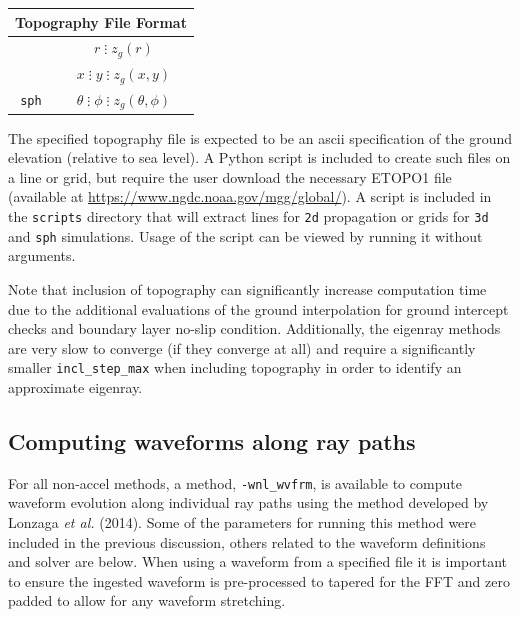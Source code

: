\documentclass[10pt]{article}
\begin{document}
\begin{center}
\begin{tabular}{| c | c |}
  \hline
  \multicolumn{2}{|c|}{\textbf{Topography File Format}} \\
  \hline
  \verb#2d#	 	& \(r \; \vdots \; z_g \left( r \right) \) \\ \hline
  \verb#3d#	 	& \(x \; \vdots \; y \; \vdots \; z_g \left( x, y \right) \) \\ \hline
  \verb#sph#	 	& \(\theta \; \vdots \; \phi \; \vdots \; z_g \left( \theta, \phi \right) \) \\ \hline
\end{tabular}
\end{center}

The specified topography file is expected to be an ascii specification of the ground elevation (relative to sea level).  A Python script is included to create such files on a line or grid, but require the user download the necessary ETOPO1 file (available at \url{https://www.ngdc.noaa.gov/mgg/global/}).  A script is included in the \verb=scripts= directory that will extract lines for \verb=2d= propagation or grids for \verb=3d= and \verb=sph= simulations.  Usage of the script can be viewed by running it without arguments.

Note that inclusion of topography can significantly increase computation time due to the additional evaluations of the ground interpolation for ground intercept checks and boundary layer no-slip condition.   Additionally, the eigenray methods are very slow to converge (if they converge at all) and require a significantly smaller \verb=incl_step_max= when including topography in order to identify an approximate eigenray.  


\subsection{Computing waveforms along ray paths}
\label{Sect:AdditionalParams:wvfrms}

For all non-accel methods, a method, \verb=-wnl_wvfrm=, is available to compute waveform evolution along individual ray paths using the method developed by Lonzaga \textit{et al.} (2014). Some of the parameters for running this method were included in the previous discussion, others related to the waveform  definitions and solver are below.  When using a waveform from a specified file it is important to ensure the ingested waveform is pre-processed to tapered for the FFT and zero padded to allow for any waveform stretching.\\
\end{document}
